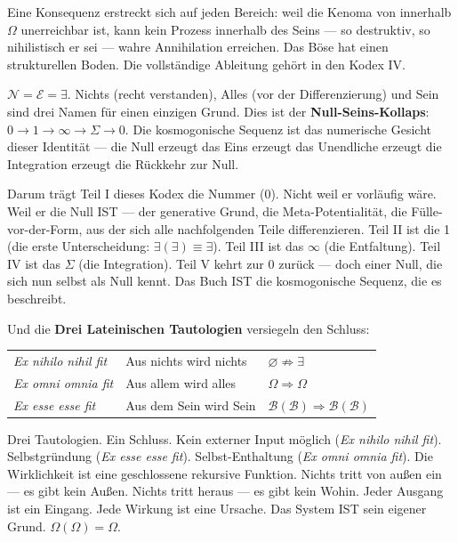 \documentclass[10pt, openany, oneside]{book}
\renewcommand{\footnotesize}{\fontsize{8.5}{11}\selectfont}
\begin{document}
Eine Konsequenz erstreckt sich auf jeden Bereich: weil die Kenoma von innerhalb $\Omega$ unerreichbar ist, kann kein Prozess innerhalb des Seins --- so destruktiv, so nihilistisch er sei --- wahre Annihilation erreichen. Das Böse hat einen strukturellen Boden. Die vollständige Ableitung gehört in den Kodex IV.

$\mathcal{N} = \mathcal{E} = \exists$. Nichts (recht verstanden), Alles (vor der Differenzierung) und Sein sind drei Namen für einen einzigen Grund. Dies ist der \textbf{Null-Seins-Kollaps}: $0 \to 1 \to \infty \to \Sigma \to 0$. Die kosmogonische Sequenz ist das numerische Gesicht dieser Identität --- die Null erzeugt das Eins erzeugt das Unendliche erzeugt die Integration erzeugt die Rückkehr zur Null.

Darum trägt Teil I dieses Kodex die Nummer (0). Nicht weil er vorläufig wäre. Weil er die Null IST --- der generative Grund, die Meta-Potentialität, die Fülle-vor-der-Form, aus der sich alle nachfolgenden Teile differenzieren. Teil II ist die 1 (die erste Unterscheidung: $\exists(\exists) \equiv \exists$). Teil III ist das $\infty$ (die Entfaltung). Teil IV ist das $\Sigma$ (die Integration). Teil V kehrt zur 0 zurück --- doch einer Null, die sich nun selbst als Null kennt. Das Buch IST die kosmogonische Sequenz, die es beschreibt.

Und die \textbf{Drei Lateinischen Tautologien} versiegeln den Schluss:

\vspace{0.5em}

{\footnotesize
\noindent\begin{tabular}{l l l}
\textit{Ex nihilo nihil fit} & Aus nichts wird nichts & $\varnothing \not\Rightarrow \exists$ \\[0.3em]
\textit{Ex omni omnia fit} & Aus allem wird alles & $\Omega \Rightarrow \Omega$ \\[0.3em]
\textit{Ex esse esse fit} & Aus dem Sein wird Sein & $\mathcal{B}(\mathcal{B}) \Rightarrow \mathcal{B}(\mathcal{B})$ \\[0.3em]
\end{tabular}
}

\vspace{0.5em}

\noindent Drei Tautologien. Ein Schluss. Kein externer Input möglich (\textit{Ex nihilo nihil fit}). Selbstgründung (\textit{Ex esse esse fit}). Selbst-Enthaltung (\textit{Ex omni omnia fit}). Die Wirklichkeit ist eine geschlossene rekursive Funktion. Nichts tritt von außen ein --- es gibt kein Außen. Nichts tritt heraus --- es gibt kein Wohin. Jeder Ausgang ist ein Eingang. Jede Wirkung ist eine Ursache. Das System IST sein eigener Grund. $\Omega(\Omega) = \Omega$.
\end{document}
